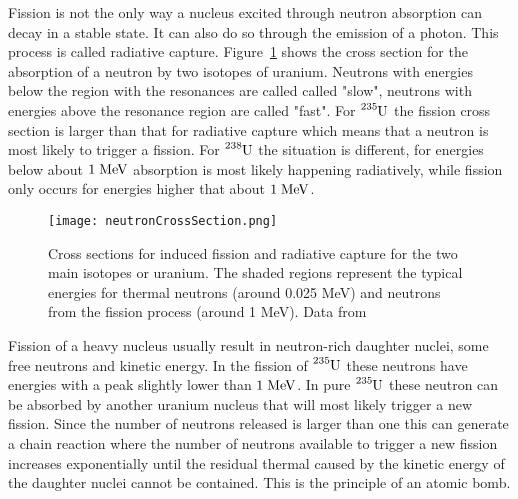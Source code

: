 \documentclass[12pt]{article}
\begin{document}
Fission is not the only way a nucleus excited through neutron absorption can decay in a stable state. It can also do so through the emission of a photon. This process is called radiative capture. Figure~\ref{fig:neutronCrossSection} shows the cross section for the absorption of a neutron by two isotopes of uranium. Neutrons with energies below the region with the resonances are called called "slow", neutrons with energies above the resonance region are called "fast". For $\ce{^{235}U}$ the fission cross section is larger than that for radiative capture which means that a neutron is most likely to trigger a fission. For $\ce{^{238}U}$ the situation is different, for energies below about $1\;\rm{MeV}$ absorption is most likely happening radiatively, while fission only occurs for energies higher that about $1\;\rm{MeV}$. 
\begin{figure}
\begin{center}
\texttt{[image: neutronCrossSection.png]}   
\end{center}
\caption{Cross sections for induced fission and radiative capture for the two main isotopes or uranium. The shaded regions represent the typical energies for thermal neutrons (around 0.025 MeV) and neutrons from the fission process (around 1 MeV). Data from \cite{nds}}\label{fig:neutronCrossSection}
\end{figure} 
Fission of a heavy nucleus usually result in neutron-rich daughter nuclei, some free neutrons and kinetic energy. In the fission of $\ce{^{235}U}$ these neutrons have energies with a peak slightly lower than $1\;\rm{MeV}$. In pure $\ce{^{235}U}$ these neutron can be absorbed by another uranium nucleus that will most likely trigger a new fission. Since the number of neutrons released is larger than one this can generate a chain reaction where the number of neutrons available to trigger a new fission increases exponentially until the residual thermal caused by the kinetic energy of the daughter nuclei cannot be contained. This is the principle of an atomic bomb. 
\end{document}
